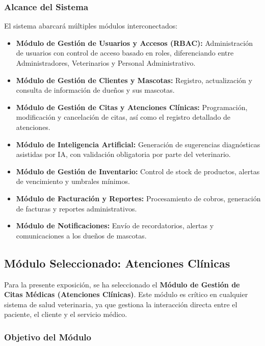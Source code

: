 \documentclass[12pt,a4paper]{article}
\begin{document}
\subsubsection{Alcance del Sistema}

El sistema abarcará múltiples módulos interconectados:

\begin{itemize}
    \item \textbf{Módulo de Gestión de Usuarios y Accesos (RBAC):} Administración de usuarios con control de acceso basado en roles, diferenciando entre Administradores, Veterinarios y Personal Administrativo.
    \item \textbf{Módulo de Gestión de Clientes y Mascotas:} Registro, actualización y consulta de información de dueños y sus mascotas.
    \item \textbf{Módulo de Gestión de Citas y Atenciones Clínicas:} Programación, modificación y cancelación de citas, así como el registro detallado de atenciones.
    \item \textbf{Módulo de Inteligencia Artificial:} Generación de sugerencias diagnósticas asistidas por IA, con validación obligatoria por parte del veterinario.
    \item \textbf{Módulo de Gestión de Inventario:} Control de stock de productos, alertas de vencimiento y umbrales mínimos.
    \item \textbf{Módulo de Facturación y Reportes:} Procesamiento de cobros, generación de facturas y reportes administrativos.
    \item \textbf{Módulo de Notificaciones:} Envío de recordatorios, alertas y comunicaciones a los dueños de mascotas.
\end{itemize}

\subsection{Módulo Seleccionado: Atenciones Clínicas}

Para la presente exposición, se ha seleccionado el \textbf{Módulo de Gestión de Citas Médicas (Atenciones Clínicas)}. Este módulo es crítico en cualquier sistema de salud veterinaria, ya que gestiona la interacción directa entre el paciente, el cliente y el servicio médico.

\subsubsection{Objetivo del Módulo}
\end{document}
